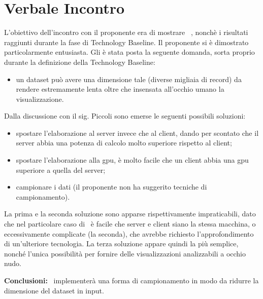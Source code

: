 \section{Verbale Incontro}
L'obiettivo dell'incontro con il proponente era di mostrare \hd\ , nonchè i risultati raggiunti durante la fase di Technology Baseline. Il proponente si è dimostrato particolarmente entusiasta. Gli è stata posta la seguente domanda, sorta proprio durante la definizione della Technology Baseline:
\begin{itemize}
    \item un dataset può avere una dimensione tale (diverse migliaia di record) da rendere estremamente lenta oltre che insensata all'occhio umano la visualizzazione.
\end{itemize}

Dalla discussione con il sig. Piccoli sono emerse le seguenti possibili soluzioni:
\begin{itemize}
    \item spostare l'elaborazione al server invece che al client, dando per scontato che il server abbia una potenza di calcolo molto superiore rispetto al client;
    \item spostare l'elaborazione alla gpu, è molto facile che un client abbia una gpu superiore a quella del server;
    \item campionare i dati (il proponente non ha suggerito tecniche di campionamento).
\end{itemize}
La prima e la seconda soluzione sono apparse rispettivamente impraticabili, dato che nel particolare caso di \hd\ è facile che server e client siano la stessa macchina, o eccessivamente complicate (la seconda), che avrebbe richiesto l'approfondimento di un'ulteriore tecnologia. La terza soluzione appare quindi la più semplice, nonché l'unica possibilità per fornire delle visualizzazioni analizzabili a occhio nudo.

\textbf{Conclusioni:}
\cod\ implementerà una forma di campionamento in modo da ridurre la dimensione del dataset in input.